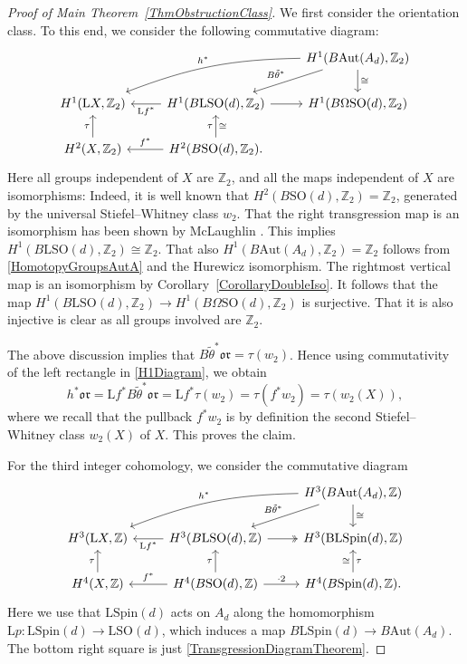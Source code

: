 \documentclass[pdftex]{sigma}
\numberwithin{equation}{section}
\newcommand{\Z}{\mathbb{Z}}
\newcommand{\B}{\mathrm{B}}
\newcommand{\SO}{\mathrm{SO}}
\newcommand{\Aut}{\mathrm{Aut}}
\newcommand{\Spin}{\mathrm{Spin}}
\renewcommand{\L}{\mathrm{L}}
\newcommand{\oclass}{\mathfrak{or}}
\begin{document}
\begin{proof}[Proof of Main Theorem~\ref{ThmObstructionClass}]
We first consider the orientation class.
To this end, we consider the following commutative diagram:
\begin{equation} \label{H1Diagram}
\begin{tikzcd}
 & & H^{1}(B\Aut(A_d), \Z_2) \ar[dl, "B\tilde{\theta}^*"'] \ar[d, "\cong"] \ar[dll, "h^*"', bend right=10]\\
 H^{1}(\L X, \Z_2) & \ar[l, "\L f^*"] H^{1}(B\L \SO(d), \Z_2) \ar[r] & H^{1}(B\Omega\SO(d), \Z_2) \\
 H^2(X, \Z_2) \ar[u, "\tau"] & \ar[l, "f^*"'] H^2(B\SO(d), \Z_2) \ar[u, "\tau", "\cong"'].
\end{tikzcd}
\end{equation}
Here all groups independent of $X$ are $\Z_2$, and all the maps independent of $X$ are isomorphisms:
Indeed, it is well known that $H^2(B\SO(d), \Z_2) = \Z_2$, generated by the universal Stiefel--Whitney class $w_2$.
That the right transgression map is an isomorphism has been shown by McLaughlin \cite[proof of Proposition~2.1]{McLaughlin}. This implies $H^{1}(B\L \SO(d), \Z_2) \cong \Z_2$.
That also ${H^1(B\Aut(A_d), \Z_2) = \Z_2}$ follows from \eqref{HomotopyGroupsAutA} and the Hurewicz isomorphism.
The rightmost vertical map is an isomorphism by Corollary~\ref{CorollaryDoubleIso}.
It follows that the map $H^{1}(B\L \SO(d), \Z_2) \to H^{1}(B\Omega\SO(d), \Z_2)$ is surjective.
That it is also injective is clear as all groups involved are $\Z_2$.

The above discussion implies that $B\tilde{\theta}^* \oclass = \tau(w_2)$.
Hence using commutativity of the left rectangle in \eqref{H1Diagram}, we obtain
\begin{equation*}
 h^* \oclass = \L f^*B\tilde{\theta}^*\oclass = \L f^* \tau(w_2) = \tau(f^*w_2) = \tau(w_2(X)),
\end{equation*}
where we recall that the pullback $f^*w_2$ is by definition the second Stiefel--Whitney class $w_2(X)$ of $X$.
This proves the claim.

For the third integer cohomology, we consider the commutative diagram
\begin{equation} \label{H3Diagram}
\begin{tikzcd}
 & & H^{3}(B\Aut(A_d), \Z) \ar[dl, "B\tilde{\theta}^*"'] \ar[dll, "h^*"', bend right = 10] \ar[d, "\cong"] \\
 H^{3}(\L X, \Z) & \ar[l, "\L f^*"] H^{3}(B\L \SO(d), \Z) \ar[r, two heads] & H^{3}(\B\L\Spin(d), \Z) \\
 H^4(X, \Z) \ar[u, "\tau"] & \ar[l, "f^*"'] H^4(B\SO(d), \Z) \ar[u, "\tau"] \ar[r, "\cdot 2"] & H^4(B \Spin(d), \Z). \ar[u, "\tau"', "\cong"]
\end{tikzcd}
\end{equation}
Here we use that $\L\Spin(d)$ acts on $A_d$ along the homomorphism $\L p\colon \L\Spin(d) \to \L\SO(d)$, which induces a map $B\L\Spin(d) \to B\Aut(A_d)$.
The bottom right square is just \eqref{TransgressionDiagramTheorem}.


\end{proof}
\end{document}
